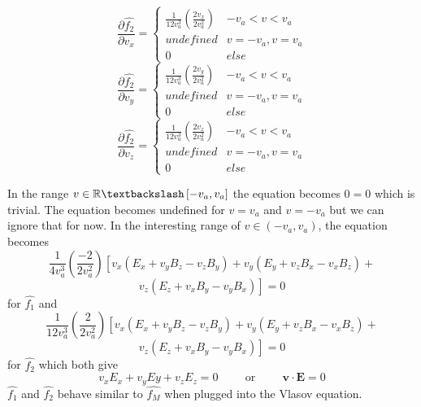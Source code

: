 \documentclass{beamer}
\begin{document}
	\begin{frame}
		\[ \frac{\displaystyle \partial \hat{f_{2}}}{\displaystyle \partial v_{x}} = 
		\begin{cases} 
			\frac{1}{12 v_{a}^{3}} \left(\frac{2 v_{x}}{2 v_{a}^2}\right) & -v_{a} < v < v_{a} \\
			undefined & v = - v_{a}, v = v_{a} \\
			0 & else 
		\end{cases}
		\]
		\[ \frac{\displaystyle \partial \hat{f_{2}}}{\displaystyle \partial v_{y}} = 
		\begin{cases} 
			\frac{1}{12 v_{a}^{3}} \left(\frac{2 v_{y}}{2 v_{a}^2}\right) & -v_{a} < v < v_{a} \\
			undefined & v = - v_{a}, v = v_{a} \\
			0 & else 
		\end{cases}
		\]
		\[ \frac{\displaystyle \partial \hat{f_{2}}}{\displaystyle \partial v_{z}} = 
		\begin{cases} 
			\frac{1}{12 v_{a}^{3}} \left(\frac{2 v_{z}}{2 v_{a}^2}\right) & -v_{a} < v < v_{a} \\
			undefined & v = - v_{a}, v = v_{a} \\
			0 & else 
		\end{cases}
		\]
	\end{frame}
	
	\begin{frame}
		In the range $v \in \mathbb{R} \textbackslash \left[-v_{a}, v_{a}\right] $ the equation becomes $0 = 0$ which is trivial. The equation becomes undefined for $v = v_{a}$ and 
		$v = - v_{a}$ but we can ignore that for now. In the interesting range of $v \in \left(-v_{a}, v_{a}\right) $, the equation becomes 
		$$ \frac{1}{4 v_{a}^{3}} \left(\frac{- 2}{2 v_{a}^2}\right) \left[v_{x}\left( E_{x} + v_{y} B_{z} - v_{z} B_{y} \right) + v_{y} \left(E_{y} + v_{z} B_{x} - v_{x} B_{z} \right) + \right. $$ $$\left. v_{z} \left(E_{z} + v_{x} B_{y} - v_{y} B_{x}\right) \right] = 0 $$
		for $\hat{f_{1}}$ and
		$$ \frac{1}{12 v_{a}^{3}} \left(\frac{2}{2 v_{a}^2}\right) \left[v_{x}\left( E_{x} + v_{y} B_{z} - v_{z} B_{y} \right) + v_{y} \left( E_{y} + v_{z} B_{x} - v_{x} B_{z} \right) + \right. $$ $$\left. v_{z} \left(E_{z} + v_{x} B_{y} - v_{y} B_{x}\right) \right] = 0 $$
		for $\hat{f_{2}}$ which both give
		$$v_{x} E_{x} + v_{y} E{y} + v_{z} E_{z} = 0 \hspace{1cm}\mathrm{or}\hspace{1cm}\textbf{v} \cdot \mathrm{\textbf{E}} = 0$$
		\noindent $\hat{f_{1}}$ and $\hat{f_{2}}$ behave similar to $\hat{f_{M}}$ when plugged into the Vlasov equation.
		
	\end{frame}
\end{document}
